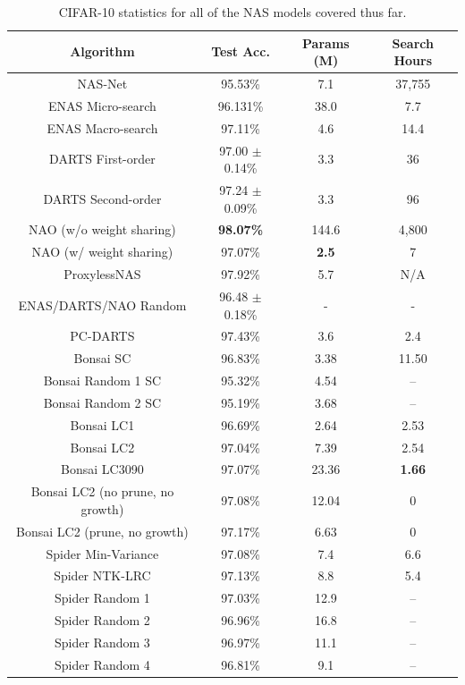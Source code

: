 \begin{table}[ht!]
\begin{center}
\begin{tabular}{c|c|c|c}
Algorithm & Test Acc. & Params (M) & Search Hours\\
\hline
NAS-Net                     & 95.53\% 	                    & 7.1   		& 37,755 \\
ENAS Micro-search	        & 96.131\%            		    & 38.0  		& 7.7     \\
ENAS Macro-search		    & 97.11\%            		    & 4.6   		& 14.4    \\
DARTS First-order     	    & 97.00 $\pm$ 0.14\% 		    & 3.3   		& 36      \\
DARTS Second-order     	    & 97.24 $\pm$ 0.09\% 		    & 3.3   		& 96 \\
NAO (w/o weight sharing)    & \textbf{98.07\%} 	            & 144.6 		& 4,800 \\
NAO (w/ weight sharing)     & 97.07\%        	            & \textbf{2.5}  & 7 \\
ProxylessNAS                & 97.92\%                       & 5.7           & N/A           \\
ENAS/DARTS/NAO Random	  	& 96.48 $\pm$ 0.18\%			& -				& -\\
PC-DARTS                    & 97.43\%   	                & 3.6           & 2.4 \\
 \hline
Bonsai SC						& 96.83\% & 3.38 	& 11.50 \\
Bonsai Random 1 SC						& 95.32\% & 4.54 	& -- \\
Bonsai Random 2 SC						& 95.19\% & 3.68 	& -- \\
Bonsai LC1				 		& 96.69\% & 2.64 	& 2.53 \\
Bonsai LC2						& 97.04\% & 7.39	& 2.54 \\
Bonsai LC3090					& 97.07\% & 23.36 	& \textbf{1.66} \\
Bonsai LC2 (no prune, no growth)& 97.08\% & 12.04	& 0\\
Bonsai LC2 (prune, no growth)	& 97.17\% & 6.63   	& 0\\
 \hline
Spider Min-Variance             & 97.08\% & 7.4     & 6.6 \\
Spider NTK-LRC                  & 97.13\% & 8.8     & 5.4 \\
Spider Random 1                 & 97.03\% & 12.9    & -- \\
Spider Random 2                 & 96.96\% & 16.8    & -- \\
Spider Random 3                 & 96.97\% & 11.1    & -- \\
Spider Random 4                 & 96.81\% & 9.1      & --
\end{tabular}
\end{center}
\caption[CIFAR-10 statistics for all of the NAS models covered thus far, including BonsaiNet and SpiderNet]{CIFAR-10 statistics for all of the NAS models covered thus far.}
\label{tab:spider_comp_performance}
\end{table}


